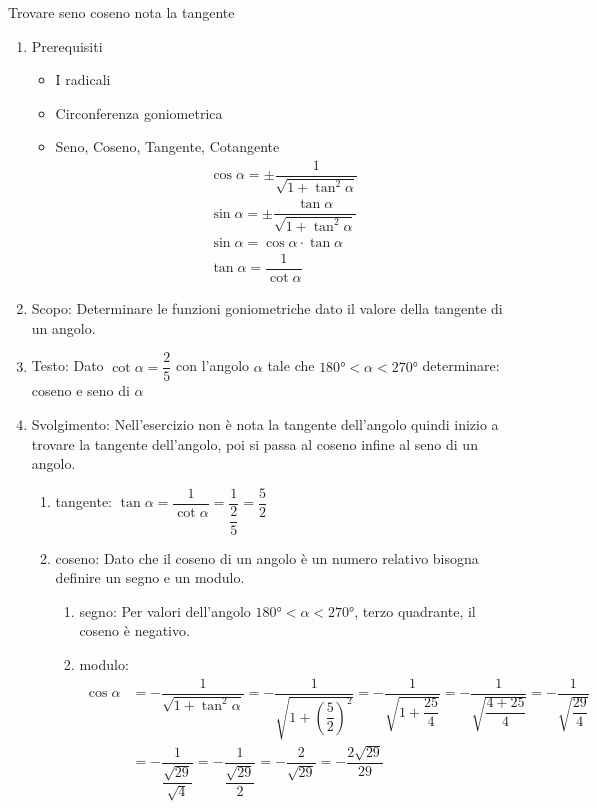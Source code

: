 \begin{table}[H]
	\caption{Trovare seno coseno nota la tangente}
	\label{tab:sommadifangoli}
	\begin{enumerate}
		\item Prerequisiti 
		\begin{itemize}
			\item I radicali
			\item Circonferenza goniometrica
			\item Seno, Coseno, Tangente, Cotangente
			\begin {align*}
			\cos\alpha=\pm\dfrac{1}{\sqrt{1+\tan^2\alpha}}\\
			\sin\alpha=\pm\dfrac{\tan\alpha}{\sqrt{1+\tan^2\alpha}}\\
			\sin\alpha=\cos\alpha\cdot\tan\alpha\\
			\tan\alpha=\dfrac{1}{\cot\alpha}
		\end{align*}
	\end{itemize}
	\item Scopo: Determinare le funzioni goniometriche dato il valore della tangente di un angolo.
	\item Testo: Dato $\cot\alpha=\dfrac{2}{5}$ con l'angolo $\alpha$ tale che $\ang{180}<\alpha<\ang{270}$ determinare: coseno e seno di $\alpha$
	\item Svolgimento: Nell'esercizio non è nota la tangente dell'angolo quindi inizio a trovare la tangente dell'angolo, poi si passa al coseno infine al seno di un angolo.
	\begin{enumerate}
		\item tangente: $\tan\alpha=\dfrac{1}{\cot\alpha}=\dfrac{1}{\dfrac{2}{5}}=\dfrac{5}{2}$
		\item coseno: Dato che il coseno di un angolo è un numero relativo bisogna definire un segno e un modulo.
		\begin{enumerate}
			\item segno: Per valori dell'angolo  $\ang{180}<\alpha<\ang{270}$, terzo quadrante, il coseno è negativo. 
			\item modulo:
			\begin{align*}
			\cos\alpha&=-\dfrac{1}{\sqrt{1+\tan^2\alpha}}
			=-\dfrac{1}{\sqrt{1+\left(\dfrac{5}{2}\right)^2}}=-\dfrac{1}{\sqrt{1+\dfrac{25}{4}}}
			=-\dfrac{1}{\sqrt{\dfrac{4+25}{4}}}=-\dfrac{1}{\sqrt{\dfrac{29}{4}}}\\
			&=-\dfrac{1}{\dfrac{\sqrt{29}}{\sqrt{4}}}=-\dfrac{1}{\dfrac{\sqrt{29}}{2}}=-\dfrac{2}{\sqrt{29}}=-\dfrac{2\sqrt{29}}{29}
			\end{align*}

\end{enumerate}
\end{enumerate}
\end{enumerate}
\end{table}
